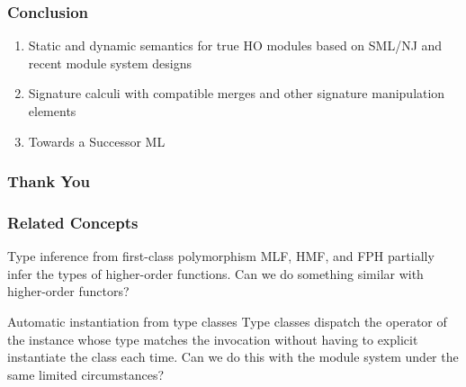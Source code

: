 \documentclass{beamer}
\begin{document}
\begin{frame}
\frametitle{Conclusion}	
\begin{enumerate}
	\itemsep=0.5cm
	\item Static and dynamic semantics for true HO modules based on SML/NJ and recent module system designs
	\item Signature calculi with compatible merges and other signature manipulation elements
	\item Towards a Successor ML
\end{enumerate}
\end{frame}

\begin{frame}
\frametitle{Thank You}

\end{frame}

\begin{frame}
\frametitle{Related Concepts}
\begin{block}{Type inference from first-class polymorphism}
	MLF, HMF, and FPH partially infer the types of higher-order functions. Can we do something similar with higher-order functors?
\end{block}
\begin{block}{Automatic instantiation from type classes}
	Type classes dispatch the operator of the instance whose type matches the invocation without having to explicit instantiate the class each time. Can we do this with the module system under the same limited circumstances?
\end{block}
\end{frame}
\end{document}
